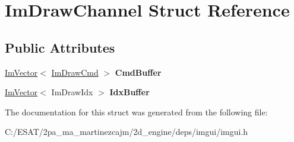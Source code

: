 \hypertarget{struct_im_draw_channel}{}\section{Im\+Draw\+Channel Struct Reference}
\label{struct_im_draw_channel}
\subsection*{Public Attributes}
\begin{DoxyCompactItemize}
\item 
\mbox{\label{struct_im_draw_channel_abdaa17053d55fb6757c1971d410ceddf}} 
\hyperlink{class_im_vector}{Im\+Vector}$<$ \hyperlink{struct_im_draw_cmd}{Im\+Draw\+Cmd} $>$ {\bfseries Cmd\+Buffer}
\item 
\mbox{\label{struct_im_draw_channel_a7fbed7d3523124fadd94859d5ac0fd67}} 
\hyperlink{class_im_vector}{Im\+Vector}$<$ Im\+Draw\+Idx $>$ {\bfseries Idx\+Buffer}
\end{DoxyCompactItemize}


The documentation for this struct was generated from the following file\+:\begin{DoxyCompactItemize}
\item 
C\+:/\+E\+S\+A\+T/2pa\+\_\+ma\+\_\+martinezcajm/2d\+\_\+engine/deps/imgui/imgui.\+h\end{DoxyCompactItemize}
